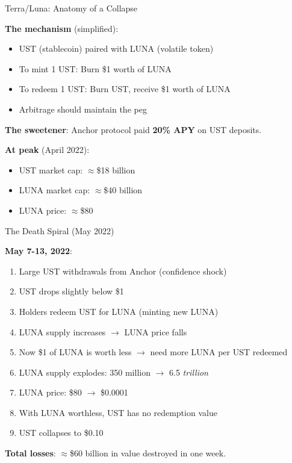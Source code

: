 \documentclass[10pt]{beamer}
\newcommand{\highlight}[1]{\textcolor{AccentOrange}{\textbf{#1}}}
\begin{document}
\begin{frame}{Terra/Luna: Anatomy of a Collapse}
  
  \textbf{The mechanism} (simplified):
  \begin{itemize}
    \item UST (stablecoin) paired with LUNA (volatile token)
    \item To mint 1 UST: Burn \$1 worth of LUNA
    \item To redeem 1 UST: Burn UST, receive \$1 worth of LUNA
    \item Arbitrage should maintain the peg
  \end{itemize}
  
  \vspace{1em}
  \textbf{The sweetener}: Anchor protocol paid \highlight{20\% APY} on UST deposits.
  
  \vspace{1em}
  \textbf{At peak} (April 2022):
  \begin{itemize}
    \item UST market cap: $\approx$\$18 billion
    \item LUNA market cap: $\approx$\$40 billion
    \item LUNA price: $\approx$\$80
  \end{itemize}
\end{frame}

\begin{frame}{The Death Spiral (May 2022)}
  
  \textbf{May 7-13, 2022}:
  \begin{enumerate}
    \item Large UST withdrawals from Anchor (confidence shock)
    \item UST drops slightly below \$1
    \item Holders redeem UST for LUNA (minting new LUNA)
    \item LUNA supply increases $\rightarrow$ LUNA price falls
    \item Now \$1 of LUNA is worth less $\rightarrow$ need more LUNA per UST redeemed
    \item LUNA supply explodes: 350 million $\rightarrow$ 6.5 \textit{trillion}
    \item LUNA price: \$80 $\rightarrow$ \$0.0001
    \item With LUNA worthless, UST has no redemption value
    \item UST collapses to \$0.10
  \end{enumerate}
  
  \vspace{0.5em}
  \textbf{Total losses}: $\approx$\$60 billion in value destroyed in one week.
\end{frame}
\end{document}
